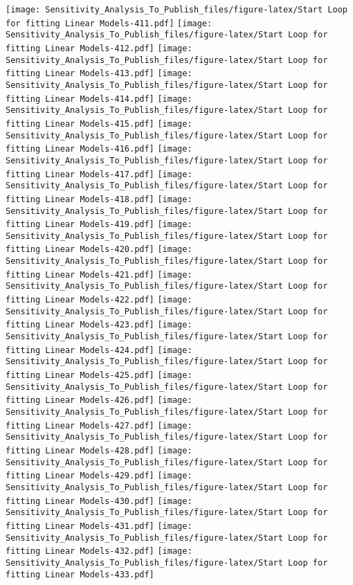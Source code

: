 \documentclass[
]{article}
\begin{document}
\texttt{[image: Sensitivity\_Analysis\_To\_Publish\_files/figure-latex/Start Loop for fitting Linear Models-411.pdf]}
\texttt{[image: Sensitivity\_Analysis\_To\_Publish\_files/figure-latex/Start Loop for fitting Linear Models-412.pdf]}
\texttt{[image: Sensitivity\_Analysis\_To\_Publish\_files/figure-latex/Start Loop for fitting Linear Models-413.pdf]}
\texttt{[image: Sensitivity\_Analysis\_To\_Publish\_files/figure-latex/Start Loop for fitting Linear Models-414.pdf]}
\texttt{[image: Sensitivity\_Analysis\_To\_Publish\_files/figure-latex/Start Loop for fitting Linear Models-415.pdf]}
\texttt{[image: Sensitivity\_Analysis\_To\_Publish\_files/figure-latex/Start Loop for fitting Linear Models-416.pdf]}
\texttt{[image: Sensitivity\_Analysis\_To\_Publish\_files/figure-latex/Start Loop for fitting Linear Models-417.pdf]}
\texttt{[image: Sensitivity\_Analysis\_To\_Publish\_files/figure-latex/Start Loop for fitting Linear Models-418.pdf]}
\texttt{[image: Sensitivity\_Analysis\_To\_Publish\_files/figure-latex/Start Loop for fitting Linear Models-419.pdf]}
\texttt{[image: Sensitivity\_Analysis\_To\_Publish\_files/figure-latex/Start Loop for fitting Linear Models-420.pdf]}
\texttt{[image: Sensitivity\_Analysis\_To\_Publish\_files/figure-latex/Start Loop for fitting Linear Models-421.pdf]}
\texttt{[image: Sensitivity\_Analysis\_To\_Publish\_files/figure-latex/Start Loop for fitting Linear Models-422.pdf]}
\texttt{[image: Sensitivity\_Analysis\_To\_Publish\_files/figure-latex/Start Loop for fitting Linear Models-423.pdf]}
\texttt{[image: Sensitivity\_Analysis\_To\_Publish\_files/figure-latex/Start Loop for fitting Linear Models-424.pdf]}
\texttt{[image: Sensitivity\_Analysis\_To\_Publish\_files/figure-latex/Start Loop for fitting Linear Models-425.pdf]}
\texttt{[image: Sensitivity\_Analysis\_To\_Publish\_files/figure-latex/Start Loop for fitting Linear Models-426.pdf]}
\texttt{[image: Sensitivity\_Analysis\_To\_Publish\_files/figure-latex/Start Loop for fitting Linear Models-427.pdf]}
\texttt{[image: Sensitivity\_Analysis\_To\_Publish\_files/figure-latex/Start Loop for fitting Linear Models-428.pdf]}
\texttt{[image: Sensitivity\_Analysis\_To\_Publish\_files/figure-latex/Start Loop for fitting Linear Models-429.pdf]}
\texttt{[image: Sensitivity\_Analysis\_To\_Publish\_files/figure-latex/Start Loop for fitting Linear Models-430.pdf]}
\texttt{[image: Sensitivity\_Analysis\_To\_Publish\_files/figure-latex/Start Loop for fitting Linear Models-431.pdf]}
\texttt{[image: Sensitivity\_Analysis\_To\_Publish\_files/figure-latex/Start Loop for fitting Linear Models-432.pdf]}
\texttt{[image: Sensitivity\_Analysis\_To\_Publish\_files/figure-latex/Start Loop for fitting Linear Models-433.pdf]}
\end{document}
